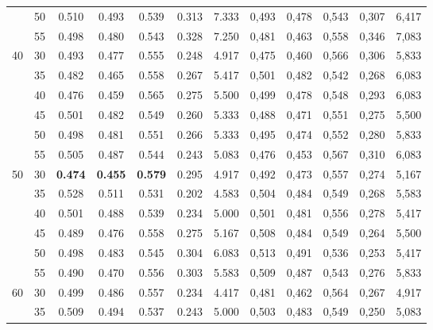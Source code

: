 \begin{table}[!h]
\begin{tabular}{|c|c||c|c|c|c|c||c|c|c|c|c|}
  & 50 & 0.510 & 0.493 & 0.539 & 0.313  & 7.333                & 0,493 & 0,478 & 0,543 & 0,307 & 6,417  \\ \cline{2-12}                
  & 55 & 0.498 & 0.480 & 0.543 & 0.328  & 7.250                & 0,481 & 0,463 & 0,558 & 0,346 & 7,083  \\ \hline     
 \multirow{6}{*}{40} 
  & 30 & 0.493 & 0.477 & 0.555 & 0.248  & 4.917                & 0,475 & 0,460 & 0,566 & 0,306 & 5,833  \\ \cline{2-12} 
  & 35 & 0.482 & 0.465 & 0.558 & 0.267  & 5.417                & 0,501 & 0,482 & 0,542 & 0,268 & 6,083  \\ \cline{2-12} 
  & 40 & 0.476 & 0.459 & 0.565 & 0.275  & 5.500                & 0,499 & 0,478 & 0,548 & 0,293 & 6,083  \\ \cline{2-12} 
  & 45 & 0.501 & 0.482 & 0.549 & 0.260  & 5.333                & 0,488 & 0,471 & 0,551 & 0,275 & 5,500  \\ \cline{2-12} 
  & 50 & 0.498 & 0.481 & 0.551 & 0.266  & 5.333                & 0,495 & 0,474 & 0,552 & 0,280 & 5,833  \\ \cline{2-12} 
  & 55 & 0.505 & 0.487 & 0.544 & 0.243  & 5.083                & 0,476 & 0,453 & 0,567 & 0,310 & 6,083  \\ \hline      
 \multirow{6}{*}{50} 
 & 30 & \cellcolor{gray!20} \textbf{0.474} & \cellcolor{gray!20} \textbf{0.455} & \cellcolor{gray!20} \textbf{0.579} & 0.295 & 4.917 & 0,492 & 0,473 & 0,557 & 0,274 & 5,167  \\ \cline{2-12}
  & 35 & 0.528 & 0.511 & 0.531 & 0.202  & 4.583                & 0,504 & 0,484 & 0,549 & 0,268 & 5,583  \\ \cline{2-12} 
  & 40 & 0.501 & 0.488 & 0.539 & 0.234  & 5.000                & 0,501 & 0,481 & 0,556 & 0,278 & 5,417  \\ \cline{2-12} 
  & 45 & 0.489 & 0.476 & 0.558 & 0.275  & 5.167                & 0,508 & 0,484 & 0,549 & 0,264 & 5,500  \\ \cline{2-12} 
  & 50 & 0.498 & 0.483 & 0.545 & 0.304  & 6.083                & 0,513 & 0,491 & 0,536 & 0,253 & 5,417  \\ \cline{2-12} 
  & 55 & 0.490 & 0.470 & 0.556 & 0.303  & 5.583                & 0,509 & 0,487 & 0,543 & 0,276 & 5,833  \\ \hline      
 \multirow{6}{*}{60}                           
  & 30 & 0.499 & 0.486 & 0.557 & 0.234  & 4.417                & 0,481 & 0,462 & 0,564 & 0,267 & 4,917  \\ \cline{2-12} 
  & 35 & 0.509 & 0.494 & 0.537 & 0.243  & 5.000                & 0,503 & 0,483 & 0,549 & 0,250 & 5,083  \\ \cline{2-12} 

\end{tabular}
\end{table}
